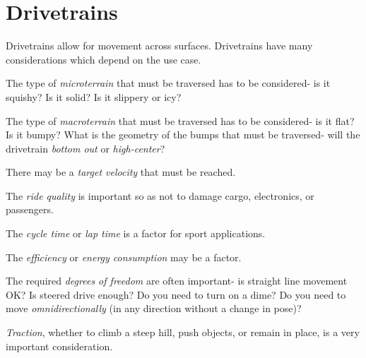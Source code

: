 
\section{Drivetrains} \label{sec:drivetrains}
Drivetrains allow for movement across surfaces. Drivetrains have many considerations which depend on the use case.
\begin{asparaenum}[a)]
\item The type of \textit{microterrain} that must be traversed has to be considered- is it squishy? Is it solid? Is it slippery or icy? 
\item The type of \textit{macroterrain} that must be traversed has to be considered- is it flat? Is it bumpy? What is the geometry of the bumps that must be traversed- will the drivetrain \textit{bottom out} or \textit{high-center}?
\item There may be a \textit{target velocity} that must be reached.
\item The \textit{ride quality} is important so as not to damage cargo, electronics, or passengers.
\item The \textit{cycle time} or \textit{lap time} is a factor for sport applications.
\item The \textit{efficiency} or \textit{energy consumption} may be a factor.
\item The required \textit{degrees of freedom} are often important- is straight line movement OK? Is steered drive enough? Do you need to turn on a dime? Do you need to move \textit{omnidirectionally} (in any direction without a change in pose)?
\item \textit{Traction}, whether to climb a steep hill, push objects, or remain in place, is a very important consideration.
\end{asparaenum}
